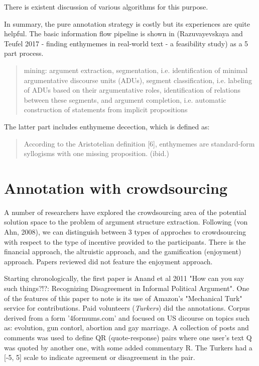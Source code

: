 \documentclass{report}
\begin{document}
{There is existent discussion \cite{artstein_inter-coder_2008} of various algorithms for this purpose.

In summary, the pure annotation strategy is costly but its experiences are quite helpful. The basic information flow pipeline is shown in (Razuvayevskaya and Teufel 2017 - finding enthymemes in real-world text - a feasibility study) as a 5 part process.
\begin{quote}
   mining: argument extraction, segmentation, i.e. identification of minimal argumentative discourse units (ADUs), segment classification, i.e. labeling of ADUs based on their argumentative roles, identification of relations between these segments, and argument completion, i.e. automatic construction of statements from implicit propositions
\end{quote}
\cite[page 114]{Tefuel2017}


The latter part includes enthymeme decection, which is defined as:
\begin{quote}
According to the Aristotelian definition [6], enthymemes are standard-form syllogisms with one missing proposition.  (ibid.)
\end{quote}
\cite[page 113]{Tefuel2017}

\section{Annotation with crowdsourcing}
A number of researchers have explored the crowdsourcing area of the potential solution space to the problem of argument structure extraction.
Following (von Ahn, 2008), we can distinguish between 3 types of approches to crowdsourcing with respect to the type of incentive provided to the participants.
There is the financial approach, the altruistic approach, and the gamification (enjoyment) approach. Papers reviewed did not feature the enjoyment approach.

Starting chronologically, the first paper is Anand et al 2011 "How can you say such things?!?: Recognizing Disagreement in Informal Political Argument".
One of the features of this paper to note is its use of Amazon's "Mechanical Turk" service for contributions. Paid volunteers (\textit{Turkers}) did the annotations. 
Corpus derived from a form '4formums.com' and focused on US dicourse on topics such as: evolution, gun contorl, abortion and gay marriage. A collection of posts and comments was used to define QR (quote-response) pairs where one user's text Q was quoted by another one, with some added commentary R. The Turkers had a [-5, 5] scale to indicate agreement or disagreement in the pair.

}
\end{document}

